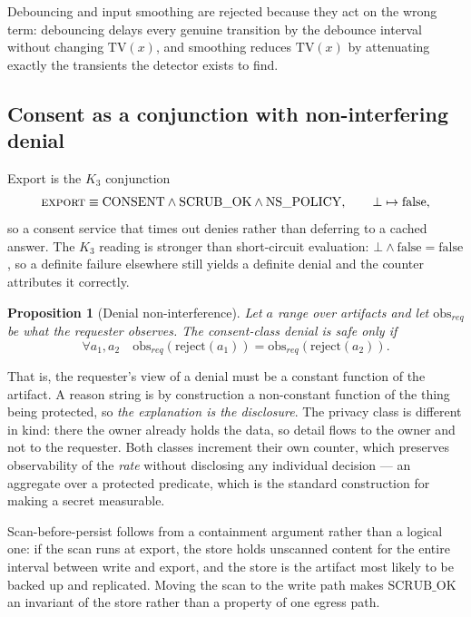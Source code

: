 \documentclass[11pt]{article}
\newtheorem{prop}{Proposition}[section]
\begin{document}
Debouncing and input smoothing are rejected because they act on the wrong term:
debouncing delays every genuine transition by the debounce interval without
changing $\mathrm{TV}(x)$, and smoothing reduces $\mathrm{TV}(x)$ by attenuating
exactly the transients the detector exists to find.

\subsection{Consent as a conjunction with non-interfering denial}
\label{lbl:HS-GATE-05}

Export is the $K_3$ conjunction
\begin{equation}
\textsc{export} \equiv \mathrm{CONSENT} \wedge \mathrm{SCRUB\_OK} \wedge
\mathrm{NS\_POLICY}, \qquad \bot \mapsto \mathrm{false},
\end{equation}
so a consent service that times out denies rather than deferring to a cached
answer. The $K_3$ reading is stronger than short-circuit evaluation: $\bot
\wedge \mathrm{false} = \mathrm{false}$, so a definite failure elsewhere still
yields a definite denial and the counter attributes it correctly.

\begin{prop}[Denial non-interference]
Let $a$ range over artifacts and let $\mathrm{obs}_{req}$ be what the requester
observes. The consent-class denial is safe only if
\begin{equation}
\forall a_1, a_2 \quad \mathrm{obs}_{req}(\mathrm{reject}(a_1)) =
\mathrm{obs}_{req}(\mathrm{reject}(a_2)).
\end{equation}
\end{prop}

That is, the requester's view of a denial must be a constant function of the
artifact. A reason string is by construction a non-constant function of the
thing being protected, so \emph{the explanation is the disclosure}. The privacy
class is different in kind: there the owner already holds the data, so detail
flows to the owner and not to the requester. Both classes increment their own
counter, which preserves observability of the \emph{rate} without disclosing
any individual decision --- an aggregate over a protected predicate, which is
the standard construction for making a secret measurable.

Scan-before-persist follows from a containment argument rather than a logical
one: if the scan runs at export, the store holds unscanned content for the
entire interval between write and export, and the store is the artifact most
likely to be backed up and replicated. Moving the scan to the write path makes
$\mathrm{SCRUB\_OK}$ an invariant of the store rather than a property of one
egress path.
\end{document}
